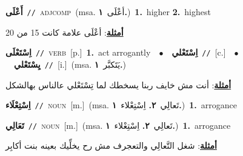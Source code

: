 \documentclass[10pt,a4paper,twoside]{article} %
\begin{document}
\begin{multicols}{2}
{\setlength\topsep{0pt}\textbf{\foreignlanguage{arabic}{أَعْلَى}}\ {\color{gray}\texttt{//}\color{black}}\ \textsc{adj\textunderscore comp}\ \color{gray}(msa. \foreignlanguage{arabic}{أعْلَى}~\foreignlanguage{arabic}{\textbf{١.}})\color{black}\ \textbf{1.}~higher  \textbf{2.}~highest\  \begin{flushright}\color{gray}\foreignlanguage{arabic}{\textbf{\underline{\foreignlanguage{arabic}{أمثلة}}}: أعْلَى علامة كانت 15 من 20}\end{flushright}\color{black}} \vspace{2mm}

{\setlength\topsep{0pt}\textbf{\foreignlanguage{arabic}{اِسْتَعْلَى}}\ {\color{gray}\texttt{//}\color{black}}\ \textsc{verb}\ [p.]\ \textbf{1.}~act arrogantly\ \ $\bullet$\ \ \setlength\topsep{0pt}\textbf{\foreignlanguage{arabic}{اِسْتَعْلي}}\ {\color{gray}\texttt{//}\color{black}}\ [c.]\ \ $\bullet$\ \ \setlength\topsep{0pt}\textbf{\foreignlanguage{arabic}{يِسْتَعْلي}}\ {\color{gray}\texttt{//}\color{black}}\ [i.]\ \color{gray}(msa. \foreignlanguage{arabic}{يَتَكبَّر}~\foreignlanguage{arabic}{\textbf{١.}})\color{black}\  \begin{flushright}\color{gray}\foreignlanguage{arabic}{\textbf{\underline{\foreignlanguage{arabic}{أمثلة}}}: أنت مش خايف ربنا يسخطك لما تِسْتَعْلي عالناس بهالشكل}\end{flushright}\color{black}} \vspace{2mm}

{\setlength\topsep{0pt}\textbf{\foreignlanguage{arabic}{اِسْتِعْلَاء}}\ {\color{gray}\texttt{//}\color{black}}\ \textsc{noun}\ [m.]\ \color{gray}(msa. \foreignlanguage{arabic}{تَعالِي}~\foreignlanguage{arabic}{\textbf{٢.}}  \foreignlanguage{arabic}{اِسْتِعْلاء}~\foreignlanguage{arabic}{\textbf{١.}})\color{black}\ \textbf{1.}~arrogance\ } \vspace{2mm}

{\setlength\topsep{0pt}\textbf{\foreignlanguage{arabic}{تَعَالِي}}\ {\color{gray}\texttt{//}\color{black}}\ \textsc{noun}\ [m.]\ \color{gray}(msa. \foreignlanguage{arabic}{تَعالِي}~\foreignlanguage{arabic}{\textbf{٢.}}  \foreignlanguage{arabic}{اِسْتِعْلاء}~\foreignlanguage{arabic}{\textbf{١.}})\color{black}\ \textbf{1.}~arrogance\  \begin{flushright}\color{gray}\foreignlanguage{arabic}{\textbf{\underline{\foreignlanguage{arabic}{أمثلة}}}: شغل التَّعالِي والتعجرف مش رح يخلِّيك بعينه بنت أكابِر}\end{flushright}\color{black}} \vspace{2mm}


\end{multicols}
\end{document}
